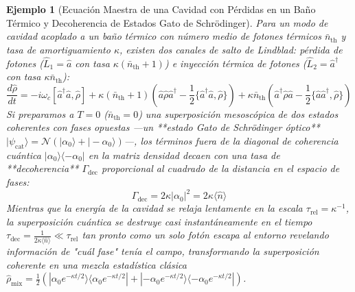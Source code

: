 \documentclass[11pt,a4paper]{book}
\newtheorem{ejemplo}{Ejemplo}[chapter]
\begin{document}
\begin{ejemplo}[Ecuación Maestra de una Cavidad con Pérdidas en un Baño Térmico y Decoherencia de Estados Gato de Schrödinger]
Para un modo de cavidad acoplado a un baño térmico con número medio de fotones térmicos $\bar{n}_{\text{th}}$ y tasa de amortiguamiento $\kappa$, existen dos canales de salto de Lindblad: pérdida de fotones ($\hat{L}_1 = \hat{a}$ con tasa $\kappa(\bar{n}_{\text{th}} + 1)$) e inyección térmica de fotones ($\hat{L}_2 = \hat{a}^\dagger$ con tasa $\kappa \bar{n}_{\text{th}}$):
\begin{equation}
\frac{d\hat{\rho}}{dt} = -i\omega_c [\hat{a}^\dagger \hat{a}, \hat{\rho}] + \kappa(\bar{n}_{\text{th}} + 1)\left( \hat{a}\hat{\rho}\hat{a}^\dagger - \frac{1}{2}\{\hat{a}^\dagger\hat{a}, \hat{\rho}\} \right) + \kappa\bar{n}_{\text{th}}\left( \hat{a}^\dagger\hat{\rho}\hat{a} - \frac{1}{2}\{\hat{a}\hat{a}^\dagger, \hat{\rho}\} \right)
\end{equation}
Si preparamos a $T=0$ ($\bar{n}_{\text{th}}=0$) una superposición mesoscópica de dos estados coherentes con fases opuestas —un **estado Gato de Schrödinger óptico** $|\psi_{\text{cat}}\rangle = \mathcal{N}(|\alpha_0\rangle + |-\alpha_0\rangle)$—, los términos fuera de la diagonal de coherencia cuántica $|\alpha_0\rangle\langle -\alpha_0|$ en la matriz densidad decaen con una tasa de **decoherencia** $\Gamma_{\text{dec}}$ proporcional al cuadrado de la distancia en el espacio de fases:
\begin{equation}
\Gamma_{\text{dec}} = 2 \kappa |\alpha_0|^2 = 2 \kappa \langle \hat{n} \rangle
\end{equation}
Mientras que la energía de la cavidad se relaja lentamente en la escala $\tau_{\text{rel}} = \kappa^{-1}$, la superposición cuántica se destruye casi instantáneamente en el tiempo $\tau_{\text{dec}} = \frac{1}{2\kappa \langle \hat{n} \rangle} \ll \tau_{\text{rel}}$ tan pronto como un solo fotón escapa al entorno revelando información de "cuál fase" tenía el campo, transformando la superposición coherente en una mezcla estadística clásica $\hat{\rho}_{\text{mix}} = \frac{1}{2}(|\alpha_0 e^{-\kappa t/2}\rangle\langle\alpha_0 e^{-\kappa t/2}| + |-\alpha_0 e^{-\kappa t/2}\rangle\langle -\alpha_0 e^{-\kappa t/2}|)$.
\end{ejemplo}

\end{document}
